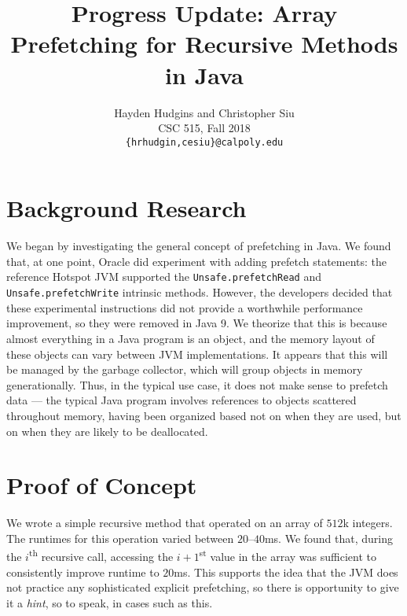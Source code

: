 \documentclass[journal,onecolumn]{IEEEtran}
\begin{document}
\title{\large Progress Update: Array Prefetching for Recursive Methods in Java}
\author{Hayden Hudgins and Christopher Siu \\
        CSC 515, Fall 2018\\
        \texttt{\{hrhudgin,cesiu\}@calpoly.edu}}

\maketitle
\vspace{-3.5em}


\section{Background Research}

We began by investigating the general concept of prefetching in Java. We found that, at one point, Oracle did experiment with adding prefetch statements: the reference Hotspot JVM supported the \texttt{Unsafe.prefetchRead} and \texttt{Unsafe.prefetchWrite} intrinsic methods. However, the developers decided that these experimental instructions did not provide a worthwhile performance improvement, so they were removed in Java 9. We theorize that this is because almost everything in a Java program is an object, and the memory layout of these objects can vary between JVM implementations. It appears that this will be managed by the garbage collector, which will group objects in memory generationally. Thus, in the typical use case, it does not make sense to prefetch data --- the typical Java program involves references to objects scattered throughout memory, having been organized based not on when they are used, but on when they are likely to be deallocated.


\section{Proof of Concept}

We wrote a simple recursive method that operated on an array of $512$k integers. The runtimes for this operation varied between $20$--$40$ms. We found that, during the $i$\textsuperscript{th} recursive call, accessing the $i + 1$\textsuperscript{st} value in the array was sufficient to consistently improve runtime to $20$ms. This supports the idea that the JVM does not practice any sophisticated explicit prefetching, so there is opportunity to give it a \textit{hint}, so to speak, in cases such as this.
\end{document}
